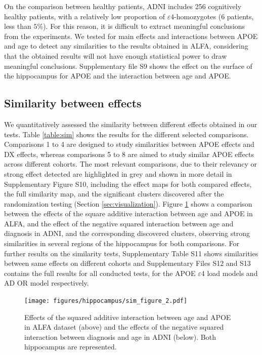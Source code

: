 On the comparison between healthy patients, ADNI includes 256 cognitively healthy patients, with a relatively low proportion of $\varepsilon4$-homozygotes (6 patients, less than $5\%$). For this reason, it is difficult to extract meaningful conclusions from the experiments. We tested for main effects and interactions between APOE and age to detect any similarities to the results obtained in ALFA, considering that the obtained results will not have enough statistical power to draw meaningful conclusions. Supplementary file S9 shows the effect on the surface of the hippocampus for APOE and the interaction between age and APOE. \\

\subsection{Similarity between effects}
\label{sec:similarity}

We quantitatively assessed the similarity between different effects obtained in our tests. Table \ref{table:sim} shows the results for the different selected comparisons. Comparisons 1 to 4 are designed to study similarities between APOE effects and DX effects, whereas comparisons 5 to 8 are aimed to study similar APOE effects across different cohorts. The most relevant comparisons, due to their relevancy or strong effect detected are highlighted in grey and shown in more detail in Supplementary Figure S10, including the effect maps for both compared effects, the full similarity map, and the significant clusters discovered after the randomization testing (Section \ref{sec:visualization}). Figure \ref{fig:sim_2} shows a comparison between the effects of the square additive interaction between age and APOE in ALFA, and the effect of the negative squared interaction between age and diagnosis in ADNI, and the corresponding discovered clusters, observing strong similarities in several regions of the hippocampus for both comparisons. For further results on the similarity tests, Supplementary Table S11 shows similarities between same effects on different cohorts and Supplementary Files S12 and S13 contains the full results for all conducted tests, for the APOE $\varepsilon$4 load models and AD OR model respectively. \\

\begin{figure}[htbp]
  \centering
  \texttt{[image: figures/hippocampus/sim\_figure\_2.pdf]}
  \caption[Effects of the squared additive interaction between age and APOE in ALFA.]{Effects of the squared additive interaction between age and APOE in ALFA dataset (above) and the effects of the negative squared interaction between diagnosis and age in ADNI (below). Both hippocampus are represented.}\label{fig:sim_2}
\end{figure}

